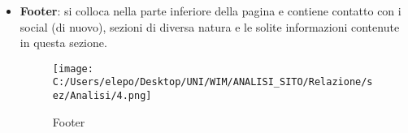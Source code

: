 \begin{itemize}
\begin{itemize}
			\end{itemize}
		\item \textbf{Footer}: si colloca nella parte inferiore della pagina e contiene contatto con i social (di nuovo), sezioni di diversa natura e le solite informazioni contenute in questa sezione.
		\begin{center}
\begin{figure}[h!]
           \begin{center}
           \texttt{[image: C:/Users/elepo/Desktop/UNI/WIM/ANALISI\_SITO/Relazione/sez/Analisi/4.png]}
           \caption{Footer}
           \end{center}
  \end{figure}
\end{center}
			
	\end{itemize}
\newpage




